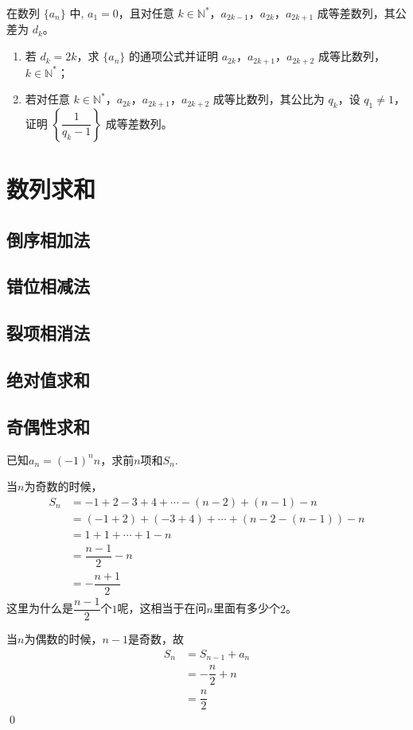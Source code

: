 \begin{example}
    在数列 \(\{a_n\}\) 中, \(a_1 = 0\)，且对任意 \(k \in \mathbb{N}^*\)，\(a_{2k-1}\)，\(a_{2k}\)，\(a_{2k+1}\) 成等差数列，其公差为 \(d_k\)。

\begin{enumerate}
    \item 若 \(d_k = 2k\)，求 \(\{a_n\}\) 的通项公式并证明 \(a_{2k}\)，\(a_{2k+1}\)，\(a_{2k+2}\) 成等比数列，\(k \in \mathbb{N}^*\)；
    \item 若对任意 \(k \in \mathbb{N}^*\)，\(a_{2k}\)，\(a_{2k+1}\)，\(a_{2k+2}\) 成等比数列，其公比为 \(q_k\)，设 \(q_1 \neq 1\)，证明 \(\left\{\dfrac{1}{q_k - 1}\right\}\) 成等差数列。
\end{enumerate}
\end{example}

\clearpage

\section{数列求和}
\subsection{倒序相加法}
\clearpage
\subsection{错位相减法}
\clearpage
\subsection{裂项相消法}
\clearpage
\subsection{绝对值求和}
\clearpage
\subsection{奇偶性求和}
\begin{example}
    已知\(a_n=(-1)^nn\)，求前\(n\)项和\(S_n\).
\end{example}
\begin{jie}
    当\(n\)为奇数的时候，
    \begin{align*}
        S_n&=-1+2-3+4+\cdots-(n-2)+(n-1)-n\\
           &=(-1+2)+(-3+4)+\cdots+(n-2-(n-1))-n\\
           &=1+1+\cdots+1-n\\
           &=\dfrac{n-1}{2}-n\\
           &=-\dfrac{n+1}{2}
    \end{align*}
    这里为什么是\(\dfrac{n-1}{2}\)个\(1\)呢，这相当于在问\(n\)里面有多少个\(2\)。

    当\(n\)为偶数的时候，\(n-1\)是奇数，故
    \begin{align*}
        S_n&=S_{n-1}+a_n\\
           &=-\dfrac{n}{2}+n\\
           &=\dfrac{n}{2}
    \end{align*}
    \qed
\end{jie}

